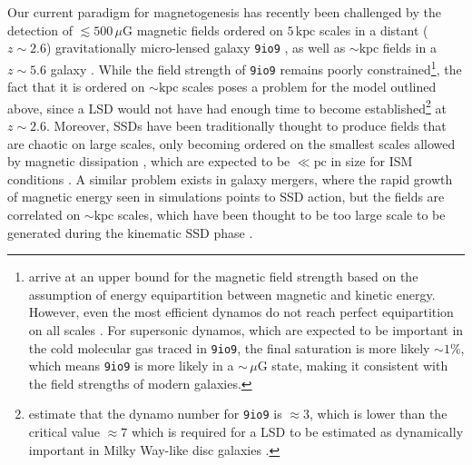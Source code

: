 \documentclass[12pt,twoside]{extreport}
\newcommand{\eg}{e.g.,\xspace} %
\begin{document}
Our current paradigm for magnetogenesis has recently been challenged by the detection of \mbox{$\lesssim 500 \,\mu\mathrm{G}$} magnetic fields ordered on $5 \,\mathrm{kpc}$ scales in a distant ($z \sim 2.6$) gravitationally micro-lensed galaxy \texttt{9io9} \citep{geach2023polarized}, as well as $\sim \mathrm{kpc}$ fields in a $z \sim 5.6$ galaxy \citep{chen2024kiloparsec}. While the field strength of \texttt{9io9} remains poorly constrained\footnote{
    \citet{geach2023polarized} arrive at an upper bound for the magnetic field strength based on the assumption of energy equipartition between magnetic and kinetic energy. However, even the most efficient dynamos do not reach perfect equipartition on all scales \citep[\eg][]{federrath2011mach, federrath2014turbulent, kriel2022fundamental, beattie2022growth}. For supersonic dynamos, which are expected to be important in the cold molecular gas traced in \texttt{9io9}, the final saturation is more likely $\sim 1\%$, which means \texttt{9io9} is more likely in a $\sim \,\mu\mathrm{G}$ state, making it consistent with the field strengths of modern galaxies.
}, the fact that it is ordered on $\sim \mathrm{kpc}$ scales poses a problem for the model outlined above, since a LSD would not have had enough time to become established\footnote{
    \citet{geach2023polarized} estimate that the dynamo number for \texttt{9io9} is $\approx 3$, which is lower than the critical value $\approx 7$ which is required for a LSD to be estimated as dynamically important in Milky Way-like disc galaxies \citep{ruzmaikin1988magnetism}.
} at $z \sim 2.6$. Moreover, SSDs have been traditionally thought to produce fields that are chaotic on large scales, only becoming ordered on the smallest scales allowed by magnetic dissipation \citep[\eg][]{schekochihin2004simulations, kriel2022fundamental, brandenburg2023dissipative}, which are expected to be $\ll \mathrm{pc}$ in size for ISM conditions \citep{marchand2016chemical}. A similar problem exists in galaxy mergers, where the rapid growth of magnetic energy seen in simulations points to SSD action, but the fields are correlated on $\sim \mathrm{kpc}$ scales, which have been thought to be too large scale to be generated during the kinematic SSD phase \citep[\eg][]{rodenbeck2016magnetic, basu2017detection, brzycki2019parameter, whittingham2021impact}.
\end{document}
